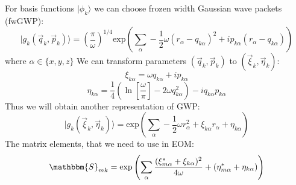 For basis functions $|\phi_k\rangle$ we can choose frozen width Gaussian wave packets (fwGWP):
$$|g_k(\vec{q}_{k},\vec{p}_{k})\rangle = \left(\frac{\pi}{\omega}\right)^{1/4} \text{exp}\left(\sum_{\alpha}-\frac{1}{2}\omega(r_{\alpha}-q_{k\alpha})^2+%
									 ip_{k\alpha}(r_{\alpha}-q_{k\alpha})\right)$$
where $\alpha \in \{x,y,z\}$
We can transform parameters $(\vec{q}_k,\vec{p}_k)$ to $(\vec{\xi}_k,\vec{\eta}_k)$:
$$\xi_{k\alpha} = \omega q_{k\alpha}+i p_{k\alpha}$$
$$\eta_{k\alpha} = \frac{1}{4}\left(\ln\left[{\frac{\omega}{\pi}}\right]-2\omega q_{k\alpha}^2\right)-iq_{k\alpha}p_{k\alpha}$$
Thus we will obtain another representation of GWP:
$$|g_k(\vec{\xi}_k,\vec{\eta}_k)\rangle=\text{exp}\left(\sum_{\alpha}-\frac{1}{2}\omega r_{\alpha}^2+\xi_{k\alpha}r_{\alpha}+\eta_{k\alpha}\right)$$
The matrix elements, that we need to use in EOM:
$$\mathbbm{S}_{mk} = \text{exp}\left(\sum_{\alpha} \frac{(\xi_{m\alpha}^*+\xi_{k\alpha})^2}{4\omega}+(\eta_{m\alpha}^*+\eta_{k\alpha})\right)$$
